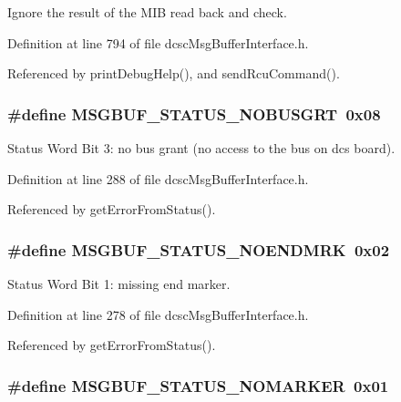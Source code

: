 Ignore the result of the MIB read back and check. 



Definition at line 794 of file dcsc\-Msg\-Buffer\-Interface.h.

Referenced by print\-Debug\-Help(), and send\-Rcu\-Command().\hypertarget{group__dcsc__msg__buffer__access_g2c69c8f183428cc8448002ccbb40223f}{
\subsubsection[MSGBUF\_\-STATUS\_\-NOBUSGRT]{\setlength{\rightskip}{0pt plus 5cm}\#define MSGBUF\_\-STATUS\_\-NOBUSGRT~0x08}}
\label{group__dcsc__msg__buffer__access_g2c69c8f183428cc8448002ccbb40223f}


Status Word Bit 3: no bus grant (no access to the bus on dcs board). 



Definition at line 288 of file dcsc\-Msg\-Buffer\-Interface.h.

Referenced by get\-Error\-From\-Status().\hypertarget{group__dcsc__msg__buffer__access_gc30e76b52c140c354f56d34019c7f1d2}{
\subsubsection[MSGBUF\_\-STATUS\_\-NOENDMRK]{\setlength{\rightskip}{0pt plus 5cm}\#define MSGBUF\_\-STATUS\_\-NOENDMRK~0x02}}
\label{group__dcsc__msg__buffer__access_gc30e76b52c140c354f56d34019c7f1d2}


Status Word Bit 1: missing end marker. 



Definition at line 278 of file dcsc\-Msg\-Buffer\-Interface.h.

Referenced by get\-Error\-From\-Status().\hypertarget{group__dcsc__msg__buffer__access_g08c36f682621c241c61818a20deb25c1}{
\subsubsection[MSGBUF\_\-STATUS\_\-NOMARKER]{\setlength{\rightskip}{0pt plus 5cm}\#define MSGBUF\_\-STATUS\_\-NOMARKER~0x01}}
\label{group__dcsc__msg__buffer__access_g08c36f682621c241c61818a20deb25c1}


